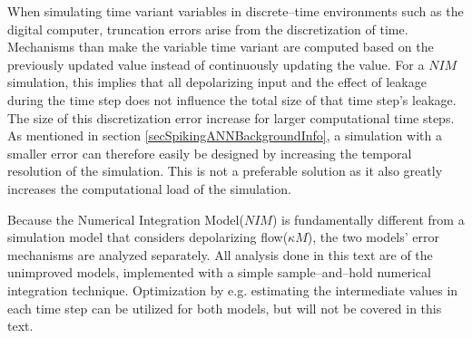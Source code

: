         When simulating time variant variables in discrete--time environments such as the digital computer, truncation errors arise from the discretization of time.
		Mechanisms than make the variable time variant are computed based on the previously updated value instead of continuously updating the  value.
		For a $NIM$ simulation, this implies that all depolarizing input and the effect of leakage during the time step does not influence the total size of that time step's leakage.
		The size of this discretization error increase for larger computational time steps.
		As mentioned in section \ref{secSpikingANNBackgroundInfo}, a simulation with a smaller error can therefore easily be designed by increasing the temporal resolution of the simulation.
		This is not a preferable solution as it also greatly increases the computational load of the simulation. 


        Because the Numerical Integration Model($NIM$) is fundamentally different from a simulation model that considers depolarizing flow($\kappa M$),
			the two models' error mechanisms are analyzed separately.
%
        All analysis done in this text are of the unimproved models, implemented with a simple sample--and--hold numerical integration technique.
        Optimization by e.g. estimating the intermediate values in each time step can be utilized for both models, but will not be covered in this text.




